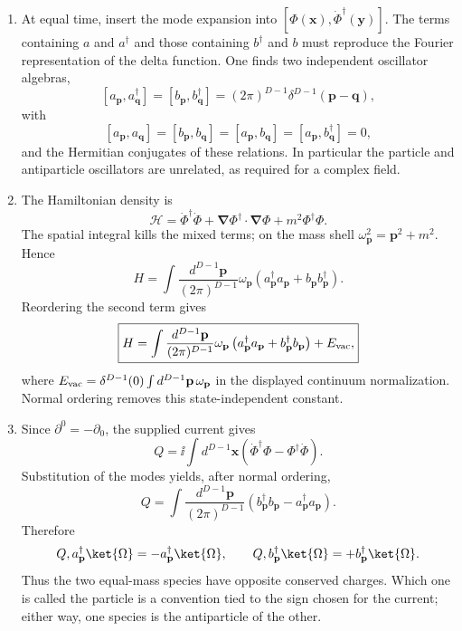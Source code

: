 \begin{enumerate}
\begin{enumerate}
\item
At equal time, insert the mode expansion into
\([\Phi(\mathbf x),\dot\Phi^\dagger(\mathbf y)]\).  The terms containing
\(a\) and \(a^\dagger\) and those containing \(b^\dagger\) and \(b\)
must reproduce the Fourier representation of the delta function.  One
finds two independent oscillator algebras,
\[
 \boxed{
 [a_{\mathbf p},a_{\mathbf q}^\dagger]
 =[b_{\mathbf p},b_{\mathbf q}^\dagger]
 =(2\pi)^{D-1}\delta^{D-1}(\mathbf p-\mathbf q),}
\]
with
\[
 [a_{\mathbf p},a_{\mathbf q}]
 =[b_{\mathbf p},b_{\mathbf q}]
 =[a_{\mathbf p},b_{\mathbf q}]
 =[a_{\mathbf p},b_{\mathbf q}^\dagger]=0,
\]
and the Hermitian conjugates of these relations.  In particular the
particle and antiparticle oscillators are unrelated, as required for a
complex field.
\item
The Hamiltonian density is
\[
 \mathcal H
 =\dot\Phi^\dagger\dot\Phi
 +\boldsymbol\nabla\Phi^\dagger\cdot\boldsymbol\nabla\Phi
 +m^2\Phi^\dagger\Phi.
\]
The spatial integral kills the mixed terms; on the mass shell
\(\omega_{\mathbf p}^2=\mathbf p^2+m^2\).  Hence
\[
 H=\int\frac{d^{D-1}\mathbf p}{(2\pi)^{D-1}}
 \omega_{\mathbf p}
 \left(a_{\mathbf p}^\dagger a_{\mathbf p}
 +b_{\mathbf p}b_{\mathbf p}^\dagger\right).
\]
Reordering the second term gives
\[
 \boxed{
 H=\int\frac{d^{D-1}\mathbf p}{(2\pi)^{D-1}}
 \omega_{\mathbf p}
 \left(a_{\mathbf p}^\dagger a_{\mathbf p}
 +b_{\mathbf p}^\dagger b_{\mathbf p}\right)
 +E_{\rm vac},}
\]
where
\(E_{\rm vac}=\delta^{D-1}(0)\int d^{D-1}\mathbf p\,\omega_{\mathbf p}\)
in the displayed continuum normalization.  Normal ordering removes this
state-independent constant.
\item
Since \(\partial^0=-\partial_0\), the supplied current gives
\[
 Q=\ii\int d^{D-1}\mathbf x\left(
 \dot\Phi^\dagger\Phi-\Phi^\dagger\dot\Phi\right).
\]
Substitution of the modes yields, after normal ordering,
\[
 \boxed{
 Q=\int\frac{d^{D-1}\mathbf p}{(2\pi)^{D-1}}
 \left(b_{\mathbf p}^\dagger b_{\mathbf p}
 -a_{\mathbf p}^\dagger a_{\mathbf p}\right).}
\]
Therefore
\[
 Q,a_{\mathbf p}^\dagger\ket{\Omega}
 =-a_{\mathbf p}^\dagger\ket{\Omega},
 \qquad
 Q,b_{\mathbf p}^\dagger\ket{\Omega}
 =+b_{\mathbf p}^\dagger\ket{\Omega}.
\]
Thus the two equal-mass species have opposite conserved charges.  Which
one is called the particle is a convention tied to the sign chosen for
the current; either way, one species is the antiparticle of the other.
\end{enumerate}
\end{enumerate}
